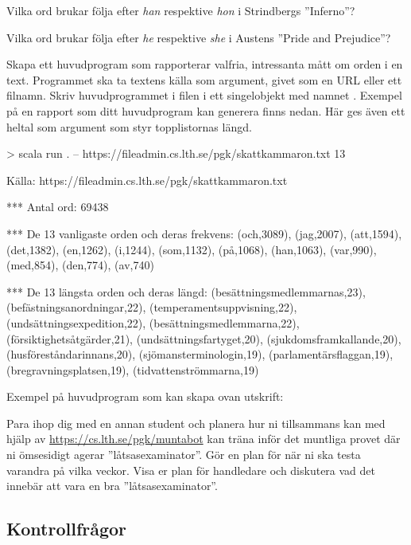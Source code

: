 \Subtask Vilka ord brukar följa efter \emph{han} respektive \emph{hon} i Strindbergs ''Inferno''?

\Subtask Vilka ord brukar följa efter \emph{he} respektive \emph{she} i Austens ''Pride and Prejudice''?


\Task Skapa ett huvudprogram som rapporterar valfria, intressanta mått om orden i en text. Programmet ska ta textens källa som argument, givet som en URL eller ett filnamn. Skriv huvudprogrammet i filen  i ett singelobjekt med namnet . Exempel på en rapport som ditt huvudprogram kan generera finns nedan. Här ges även ett heltal som argument som styr topplistornas längd.
\begin{REPL}
> scala run . -- https://fileadmin.cs.lth.se/pgk/skattkammaron.txt 13

Källa: https://fileadmin.cs.lth.se/pgk/skattkammaron.txt

*** Antal ord: 69438

*** De 13 vanligaste orden och deras frekvens:
(och,3089), (jag,2007), (att,1594), (det,1382), (en,1262),
(i,1244), (som,1132), (på,1068), (han,1063), (var,990),
(med,854), (den,774), (av,740)

*** De 13 längsta orden och deras längd:
(besättningsmedlemmarnas,23), (befästningsanordningar,22),
(temperamentsuppvisning,22), (undsättningsexpedition,22),
(besättningsmedlemmarna,22), (försiktighetsåtgärder,21),
(undsättningsfartyget,20), (sjukdomsframkallande,20),
(husföreståndarinnans,20), (sjömansterminologin,19),
(parlamentärsflaggan,19), (bregravningsplatsen,19),
(tidvattenströmmarna,19)
\end{REPL}

\noindent Exempel på huvudprogram som kan skapa ovan utskrift:

\Task Para ihop dig med en annan student och planera hur ni tillsammans kan med hjälp av \url{https://cs.lth.se/pgk/muntabot} kan träna inför det muntliga provet där ni ömsesidigt agerar ''låtsasexaminator''. Gör en plan för när ni ska testa varandra på vilka veckor. Visa er plan för handledare och diskutera vad det innebär att vara en bra ''låtsasexaminator''.


\subsection{Kontrollfrågor}\label{words-check}

